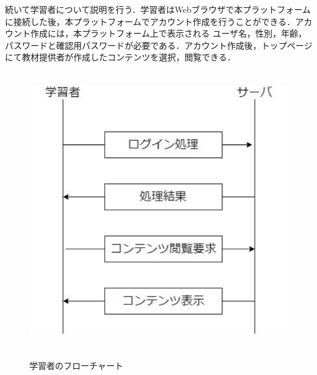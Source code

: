 \newpage
続いて学習者について説明を行う．学習者はWebブラウザで本プラットフォームに接続した後，本プラットフォームでアカウント作成を行うことができる．アカウント作成には，本プラットフォーム上で表示される
ユーザ名，性別，年齢，パスワードと確認用パスワードが必要である．アカウント作成後，トップページにて教材提供者が作成したコンテンツを選択，閲覧できる．

\begin{figure}[htbp]
    \begin{center}
        \includegraphics[width=13cm,height=12cm,keepaspectratio]{learn_flow-crop.pdf}\\
    \end{center}
    \caption{学習者のフローチャート}
    \label{learn_flow}
\end{figure}